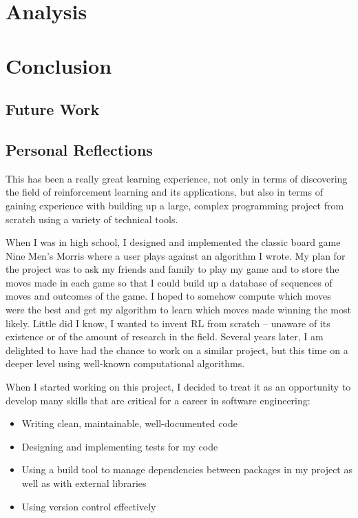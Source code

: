 \documentclass[11pt,a4paper]{report}
\begin{document}
\chapter{Analysis} %



\chapter{Conclusion}


\section{Future Work}


\section{Personal Reflections}

This has been a really great learning experience, not only in terms of discovering the field of reinforcement learning and its applications, but also in terms of gaining experience with building up a large, complex programming project from scratch using a variety of technical tools.

When I was in high school, I designed and implemented the classic board game Nine Men’s Morris where a user plays against an algorithm I wrote. My plan for the project was to ask my friends and family to play my game and to store the moves made in each game so that I could build up a database of sequences of moves and outcomes of the game. I hoped to somehow compute which moves were the best and get my algorithm to learn which moves made winning the most likely. Little did I know, I wanted to invent RL from scratch – unaware of its existence or of the amount of research in the field. Several years later, I am delighted to have had the chance to work on a similar project, but this time on a deeper level using well-known computational algorithms.

When I started working on this project, I decided to treat it as an opportunity to develop many skills that are critical for a career in software engineering:

\begin{itemize}
	\item Writing clean, maintainable, well-documented code
	\item Designing and implementing tests for my code
	\item Using a build tool to manage dependencies between packages in my project as well as with external libraries
	\item Using version control effectively
\end{itemize}
\end{document}
